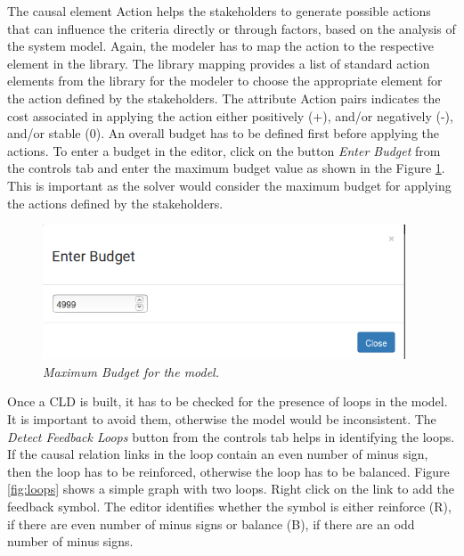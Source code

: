 \documentclass[a4paper]{article}
\begin{document}
The causal element Action helps the stakeholders to generate possible actions that can influence the criteria directly or through factors, based on the analysis of the system model. Again, the modeler has to map the action to the respective element in the library. The library mapping provides a list of standard action elements from the library for the modeler to choose the appropriate element for the action defined by the stakeholders. The attribute Action pairs indicates the cost associated in applying the action either positively (+), and/or negatively (-), and/or stable (0). An overall budget has to be defined first before applying the actions. To enter a budget in the editor, click on the button \textit{Enter Budget} from the controls tab and enter the maximum budget value as shown in the Figure \ref{fig:budget}. This is important as the solver would consider the maximum budget for applying the actions defined by the stakeholders.

\begin{figure}
\begin{center}
\includegraphics[width=0.75\linewidth, height=4cm]{img/budget.png}
\caption{\small \sl Maximum Budget for the model.\label{fig:budget}}
\end{center}
\end{figure}

Once a CLD is built, it has to be checked for the presence of loops in the model. It is important to avoid them, otherwise the model would be inconsistent. The \textit{Detect Feedback Loops} button from the controls tab helps in identifying the loops. If the causal relation links in the loop contain an even number of minus sign, then the loop has to be reinforced, otherwise the loop has to be balanced. Figure \ref{fig:loops} shows a simple graph with two loops. Right click on the link to add the feedback symbol. The editor identifies whether the symbol is either reinforce (R), if there are even number of minus signs or balance (B), if there are an odd number of minus signs.
\end{document}
